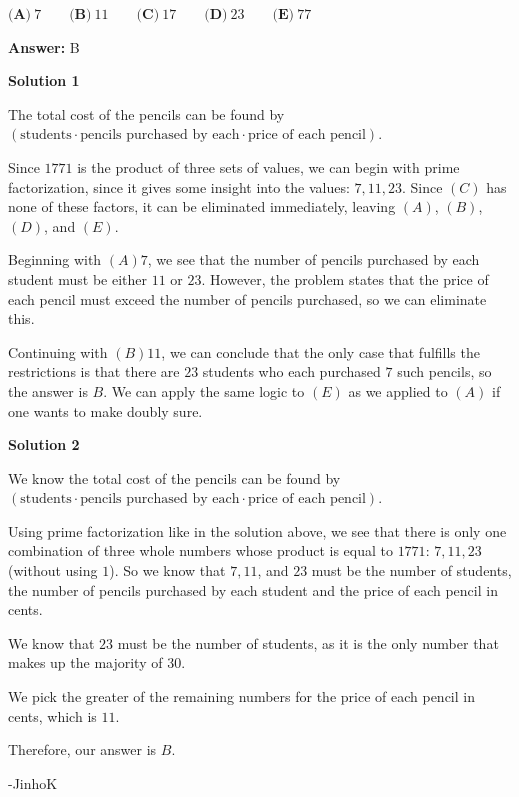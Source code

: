\begin{enumerate}
 $\textbf{(A)}\ 7 \qquad \textbf{(B)}\ 11 \qquad \textbf{(C)}\ 17 \qquad \textbf{(D)}\ 23 \qquad \textbf{(E)}\ 77$

 \textbf{Answer: }B



\textbf{Solution 1}

The total cost of the pencils can be found by $(\text{students}\cdot\text{pencils purchased by each}\cdot\text{price of each pencil})$.

 Since $1771$ is the product of three sets of values, we can begin with prime factorization, since it gives some insight into the values: $7, 11, 23$. Since $(C)$ has none of these factors, it can be eliminated immediately, leaving $(A)$, $(B)$, $(D)$, and $(E)$.

 Beginning with $(A) 7$, we see that the number of pencils purchased by each student must be either $11$ or $23$. However, the problem states that the price of each pencil must exceed the number of pencils purchased, so we can eliminate this.

 Continuing with $(B) 11$, we can conclude that the only case that fulfills the restrictions is that there are $23$ students who each purchased $7$ such pencils, so the answer is $\boxed{B}$. We can apply the same logic to $(E)$ as we applied to $(A)$ if one wants to make doubly sure.

 



\textbf{Solution 2}

We know the total cost of the pencils can be found by $(\text{students}\cdot\text{pencils purchased by each}\cdot\text{price of each pencil})$.

 Using prime factorization like in the solution above, we see that there is only one combination of three whole numbers whose product is equal to $1771$: $7, 11, 23$ (without using $1$). So we know that $7, 11$, and $23$ must be the number of students, the number of pencils purchased by each student and the price of each pencil in cents.

 We know that $23$ must be the number of students, as it is the only number that makes up the majority of 30.

 We pick the greater of the remaining numbers for the price of each pencil in cents, which is $11$.

 Therefore, our answer is $\boxed{B}$.

 -JinhoK

 




\end{enumerate}
